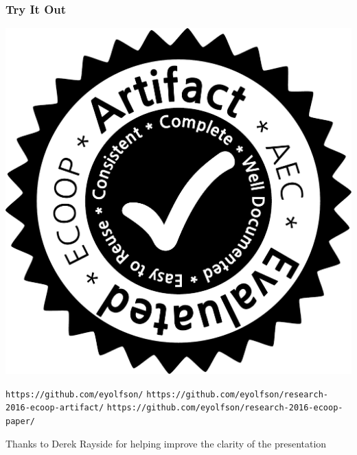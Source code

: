 \documentclass[aspectratio=43]{beamer}
\begin{document}
  \begin{frame}
    \frametitle{Try It Out}

    \begin{center}
      \includegraphics[scale=0.1]{aec-badge-ecoop}

      \vspace{0.25em}
\scriptsize
      \texttt{https://github.com/eyolfson/}
      \texttt{https://github.com/eyolfson/research-2016-ecoop-artifact/}
      \texttt{https://github.com/eyolfson/research-2016-ecoop-paper/}
    \end{center}
    Thanks to Derek Rayside for helping improve the clarity of the presentation
  \end{frame}
\end{document}
